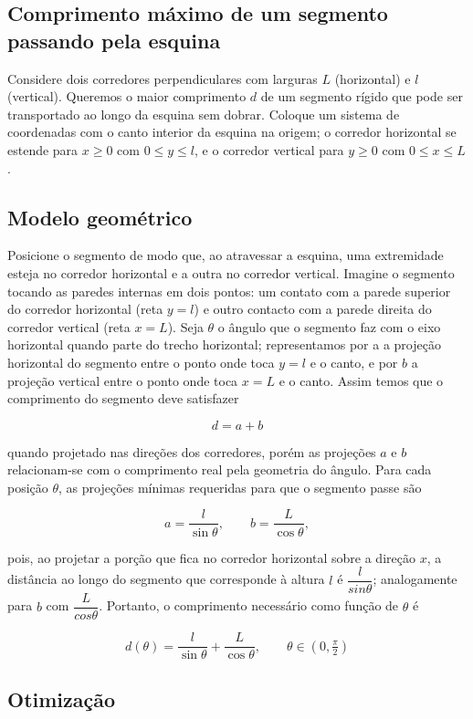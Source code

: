 \documentclass[../resumo.tex]{subfiles}
\begin{document}
\subsection{Comprimento máximo de um segmento passando pela esquina}

	Considere dois corredores perpendiculares com larguras $L$ (horizontal) e $l$ (vertical).
	Queremos o maior comprimento $d$ de um segmento rígido que pode ser transportado ao longo da
	esquina sem dobrar. Coloque um sistema de coordenadas com o canto interior da esquina na origem;
	o corredor horizontal se estende para $x \geq 0$ com $0 \leq y \leq l$, e o corredor vertical
	para $y \geq 0$ com $0 \leq x \leq L$.

	\subsection{Modelo geométrico}

	Posicione o segmento de modo que, ao atravessar a esquina, uma extremidade esteja no corredor
	horizontal e a outra no corredor vertical. Imagine o segmento tocando as paredes internas em dois pontos:
	um contato com a parede superior do corredor horizontal (reta $y = l$) e outro contacto com a parede direita
	do corredor vertical (reta $x = L$). Seja $\theta$ o ângulo que o segmento faz com o eixo horizontal
	quando parte do trecho horizontal; representamos por a a projeção horizontal do segmento entre o ponto onde
	toca $y = l$ e o canto, e por $b$ a projeção vertical entre o ponto onde toca $x = L$ e o canto.
	Assim temos que o comprimento do segmento deve satisfazer
	
	\[ d = a + b \]
	
	quando projetado nas direções dos corredores, porém as projeções $a$ e $b$ relacionam-se com o comprimento real
	pela geometria do ângulo. Para cada posição $\theta$, as projeções mínimas requeridas para que o segmento passe são

	\[ a = \frac{l}{\sin\theta},\qquad b = \frac{L}{\cos\theta},\]

	pois, ao projetar a porção que fica no corredor horizontal sobre a direção $x$, a distância ao longo do segmento que
	corresponde à altura $l$ é $\dfrac{l}{sin\theta}$; analogamente para $b$ com $\dfrac{L}{cos\theta}$.
	Portanto, o comprimento necessário como função de $\theta$ é

	\[ d(\theta)=\frac{l}{\sin\theta}+\frac{L}{\cos\theta},\qquad \theta\in(0,\tfrac{\pi}{2}) \]

	\subsection{Otimização}
\end{document}
